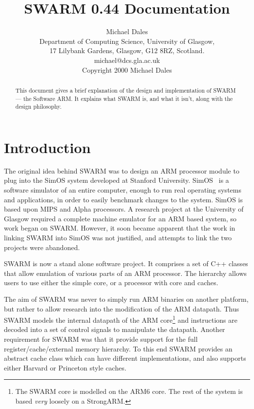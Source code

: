 \documentclass[10pt,a4paper]{article}
\title{SWARM 0.44 Documentation}
\author{Michael Dales \\[2mm]
Department of Computing Science,
University of Glasgow,\\
\small{17 Lilybank Gardens,
Glasgow, G12 8RZ, Scotland.}\\
\small{michael@dcs.gla.ac.uk}\\
\small{Copyright 2000 \Pisymbol{psy}{227} Michael Dales}}
\date{}
\begin{document}


\maketitle

\begin{abstract}
This document gives a brief explanation of the design and
implementation of SWARM --- the Software ARM. It explains what SWARM
is, and what it isn't, along with the design philosophy.
\end{abstract}

\section{Introduction} %
\label{sec:intro}      %

The original idea behind SWARM was to design an ARM processor module
to plug into the SimOS system developed at Stanford
University. SimOS~\cite{rosenblum:sosp95} is a software simulator of
an entire computer, enough to run real operating systems and
applications, in order to easily benchmark changes to the
system. SimOS is based upon MIPS and Alpha processors. A research
project at the University of Glasgow required a complete machine
emulator for an ARM based system, so work began on SWARM. However, it
soon became apparent that the work in linking SWARM into SimOS was not
justified, and attempts to link the two projects were abandoned.

SWARM is now a stand alone software project. It comprises a set of C++
classes that allow emulation of various parts of an ARM processor. The
hierarchy allows users to use either the simple core, or a processor
with core and caches.

The aim of SWARM was never to simply run ARM binaries on another
platform, but rather to allow research into the modification of the
ARM datapath. Thus SWARM models the internal datapath of the ARM
core\footnote{The SWARM core is modelled on the ARM6 core. The rest of
the system is based \emph{very} loosely on a StrongARM.} and
instructions are decoded into a set of control signals to manipulate
the datapath. Another requirement for SWARM was that it provide
support for the full register/cache/external memory hierarchy. To this
end SWARM provides an abstract cache class which can have different
implementations, and also supports either Harvard or Princeton style
caches. 
\end{document}
